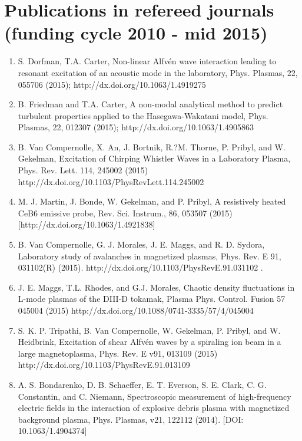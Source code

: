 \documentclass[11pt]{article}
\date{}
\title{}
\begin{document}
\section{Publications in refereed journals (funding cycle 2010 - mid 2015)}
 \begin{enumerate}

\item S. Dorfman, T.A. Carter, Non-linear Alfv\'{e}n wave interaction
  leading to resonant excitation of an acoustic mode in the
  laboratory, Phys. Plasmas, 22, 055706 (2015);
  http://dx.doi.org/10.1063/1.4919275

\item B. Friedman and T.A. Carter, A non-modal analytical method to
  predict turbulent properties applied to the Hasegawa-Wakatani model,
  Phys. Plasmas, 22, 012307 (2015); http://dx.doi.org/10.1063/1.4905863

\item B. Van Compernolle, X. An, J. Bortnik, R.?M. Thorne, P. Pribyl, and W. Gekelman, Excitation of Chirping Whistler Waves in a Laboratory Plasma, Phys. Rev. Lett. 114, 245002 (2015) http://dx.doi.org/10.1103/PhysRevLett.114.245002

\item M. J. Martin, J. Bonde, W. Gekelman, and P. Pribyl, A resistively heated CeB6 emissive probe, Rev. Sci. Instrum., 86, 053507 (2015) [http://dx.doi.org/10.1063/1.4921838]

\item B. Van Compernolle, G. J. Morales, J. E. Maggs, and R. D. Sydora, Laboratory study of avalanches in magnetized plasmas, Phys. Rev. E 91, 031102(R) (2015). http://dx.doi.org/10.1103/PhysRevE.91.031102 .

\item J. E. Maggs, T.L. Rhodes, and G.J. Morales, Chaotic density fluctuations in L-mode plasmas of the DIII-D tokamak, Plasma Phys. Control. Fusion 57 045004 (2015) http://dx.doi.org/10.1088/0741-3335/57/4/045004

\item S. K. P. Tripathi, B. Van Compernolle, W. Gekelman, P. Pribyl, and W. Heidbrink, Excitation of shear Alfv\'{e}n waves by a spiraling ion beam in a large magnetoplasma, Phys. Rev. E v91, 013109 (2015) http://dx.doi.org/10.1103/PhysRevE.91.013109

\item   A. S. Bondarenko, D. B. Schaeffer, E. T. Everson, S. E. Clark, C. G. Constantin, and C. Niemann, Spectroscopic measurement of high-frequency electric fields in the interaction of explosive debris plasma with magnetized background plasma, Phys. Plasmas, v21, 122112 (2014). [DOI: 10.1063/1.4904374]


\end{enumerate}
\end{document}
